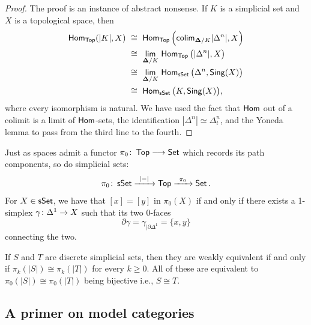 \begin{proof}
    The proof is an instance of abstract nonsense. If $K$ is a simplicial set and $X$ is a topological space, then
    \begin{align}
        \Hom_{\Top}(|K|,X)\,\, 
        &\cong \,\, \Hom_{\Top}\Big(\mathsf{colim}_{\bDelta/ K}|\Delta^{n}|, X\Big) \\
        &\cong\,\, \Limit[\bDelta / K]\Hom_{\Top}\big(|\Delta^n|,X\big) \\
        &\cong\,\, \Limit[\bDelta / K]\Hom_{\sset}\big(\Delta^n,\sing(X)\big) \\
        &\cong \,\, \Hom_{\sset}\big(K, \sing(X)\big),
    \end{align}
    where every isomorphism is natural. We have used the fact that $\operatorname{\sf Hom}$ out of a colimit is a limit of $\operatorname{\sf Hom}$-sets, the identification $|\Delta^n|\simeq\Delta^n_t$, and the Yoneda lemma to pass from the third line to the fourth.
\end{proof}



\begin{observation}\label{ch2:: obs: pi_0 simp sets}
    Just as spaces admit a functor $\pi_0 \colon \operatorname{\mathsf{Top}} \longrightarrow \operatorname{{\mathsf{Set}}}$ which records its path components, so do simplicial sets:
    \begin{equation}
        \pi_0 \colon \operatorname{\sf sSet} \xrightarrow{\,\,\, |-|\,\,\,} \operatorname{\mathsf{Top}} \xrightarrow{\,\,\, \pi_0 \,\,\,} \operatorname{{\mathsf{Set}}}.
    \end{equation}
    For $X\in \operatorname{\sf sSet}$, we have that $[x] = [y]$ in $\pi_0(X)$ if and only if there exists a 1-simplex $\gamma \colon \Delta^1 \rightarrow X$ such that its two 0-faces 
    \begin{equation}
    \partial \gamma = \gamma_{|\partial \Delta^1} = \{x,y\}
    \end{equation}
    connecting the two.
\end{observation}


\begin{observation}
    If $S$ and $T$ are discrete simplicial sets, then they are weakly equivalent if and only if $\pi_k(|S|) \cong \pi_k(|T|)$ for every $k \geq 0$. All of these are equivalent to $\pi_0(|S|) \cong \pi_0(|T|)$ being bijective i.e., $S \cong T$.
\end{observation}


\subsection{A primer on model categories}
\label{subsec:model-cats-primer}

